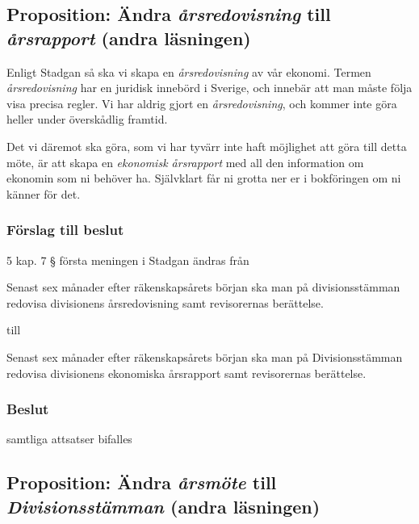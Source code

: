 \documentclass[protokoll]{dvd}
\begin{document}
\newpage
\subsection{Proposition: Ändra \emph{årsredovisning} till \emph{årsrapport} (andra läsningen)}

Enligt Stadgan så ska vi skapa en \emph{årsredovisning} av vår ekonomi.
Termen \emph{årsredovisning} har en juridisk innebörd i Sverige, och innebär att man måste följa visa precisa regler.
Vi har aldrig gjort en \emph{årsredovisning}, och kommer inte göra heller under överskådlig framtid.


Det vi däremot ska göra, som vi har tyvärr inte haft möjlighet att göra till detta möte, är att skapa en \emph{ekonomisk årsrapport} med all den information om ekonomin som ni behöver ha.
Självklart får ni grotta ner er i bokföringen om ni känner för det.

\subsubsection*{Förslag till beslut}

\begin{attsatser}
	\item 5 kap. 7 § första meningen i Stadgan ändras från

	\begin{displayquote}
        Senast sex månader efter räkenskapsårets början ska man på divisionsstämman redovisa divisionens årsredovisning samt revisorernas berättelse.
    \end{displayquote}

    till

    \begin{displayquote}
        Senast sex månader efter räkenskapsårets början ska man på Divisionsstämman redovisa divisionens ekonomiska årsrapport samt revisorernas berättelse.
    \end{displayquote}
\end{attsatser}

\subsubsection*{Beslut}
    \begin{attsatser}
        \item samtliga attsatser bifalles
    \end{attsatser}

\newpage
\subsection{Proposition: Ändra \emph{årsmöte} till \emph{Divisionsstämman} (andra läsningen)}
\end{document}
